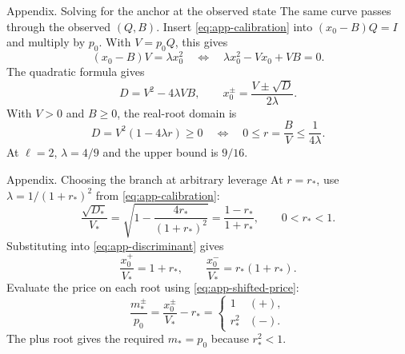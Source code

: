 \documentclass[aspectratio=169,11pt]{beamer}
\begin{document}
\begin{frame}{Appendix. Solving for the anchor at the observed state}
  The same curve passes through the observed $(Q,B)$. Insert
  \eqref{eq:app-calibration} into $(x_0-B)Q=I$ and multiply by $p_0$.
  With $V=p_0Q$, this gives
  \begin{equation}\label{eq:app-quadratic}
    (x_0-B)V=\lambda x_0^2
    \quad\Longleftrightarrow\quad
    \lambda x_0^2 - Vx_0 + VB=0.
  \end{equation}
  The quadratic formula gives
  \begin{equation}\label{eq:app-discriminant}
    D=V^2-4\lambda VB,\qquad
    x_0^\pm=\frac{V\pm\sqrt D}{2\lambda}.
  \end{equation}
  With $V>0$ and $B\ge 0$, the real-root domain is
  \begin{equation}\label{eq:app-domain}
    D=V^2(1-4\lambda r)\ge0
    \quad\Longleftrightarrow\quad
    0\le r=\frac BV\le\frac{1}{4\lambda}.
  \end{equation}
  At $\ell=2$, $\lambda=4/9$ and the upper bound is $9/16$.
\end{frame}

\begin{frame}{Appendix. Choosing the branch at arbitrary leverage}
  At $r=r_*$, use $\lambda=1/(1+r_*)^2$ from \eqref{eq:app-calibration}:
  \begin{equation}\label{eq:app-target-discriminant}
    \frac{\sqrt{D_*}}{V_*}
    =\sqrt{1-\frac{4r_*}{(1+r_*)^2}}
    =\frac{1-r_*}{1+r_*},
    \qquad 0<r_*<1.
  \end{equation}
  Substituting into \eqref{eq:app-discriminant} gives
  \begin{equation}\label{eq:app-roots-at-target}
    \frac{x_0^+}{V_*}=1+r_*,
    \qquad
    \frac{x_0^-}{V_*}=r_*(1+r_*).
  \end{equation}
  Evaluate the price on each root using \eqref{eq:app-shifted-price}:
  \begin{equation}\label{eq:app-branch}
    \frac{m_*^\pm}{p_0}=\frac{x_0^\pm}{V_*}-r_*
    =
    \begin{cases}
      1 & (+),\\
      r_*^2 & (-).
    \end{cases}
  \end{equation}
  The plus root gives the required $m_*=p_0$ because $r_*^2<1$.
\end{frame}
\end{document}
